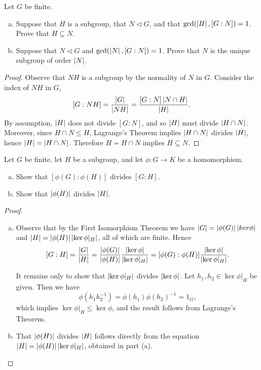 \documentclass[10pt]{amsart}
\begin{document}
\begin{thm}
  Let $G$ be finite.
  \begin{enumerate}[(a)]
	\item
		Suppose that $H$ is a subgroup, that $N \lhd G$, and that $\gcd(\left| H \right|, [G:N]) = 1$.
		Prove that $H \subseteq N$.
	\item
		Suppose that $N \lhd G$ and $\gcd(\left| N \right|, [G:N]) = 1$.
		Prove that $N$ is the unique subgroup of order $\left| N \right|$.
  \end{enumerate}
  \begin{proof}
	Observe that $NH$ is a subgroup by the normality of $N$ in $G$.
	Consider the index of $NH$ in $G$, $$[G : NH] = \frac{\left| G \right|}{\left| NH \right|} = \frac{[G:N]\left| N \cap H \right|}{\left| H \right|}.$$
	By assumption, $\left| H \right|$ does not divide $[G:N]$, and so $\left| H \right|$ must divide $\left| H \cap N \right|$.
	Moreover, since $H \cap N \leq H$, Lagrange's Theorem implies $\left| H \cap N \right|$ divides $\left| H \right|$, hence $\left| H \right| = \left| H \cap N \right|$.
	Therefore $H = H \cap N$ implies $H \subseteq N$.
  \end{proof}
\end{thm}
\begin{thm}
  Let $G$ be finite, let $H$ be a subgroup, and let $\phi \colon G \rightarrow K$ be a homomorphism.
  \begin{enumerate}[(a)]
	\item
		Show that $[\phi(G) : \phi(H)]$ divides $[G : H]$.
	\item
		Show that $\left| \phi(H) \right|$ divides $\left| H \right|$.
  \end{enumerate}
  \begin{proof}
	\begin{enumerate}[(a)]
		\item
			Observe that by the First Isomorphism Theorem we have $\left| G \right| = \left| \phi(G) \right|\left| ker\phi \right|$ and $\left| H \right| = \left| \phi(H) \right|\left| \ker\phi|_H \right|$, all of which are finite.
			Hence $$[G : H] = \frac{\left| G \right|}{\left| H \right|} 
							= \frac{\left| \phi(G) \right|}{\left| \phi(H) \right|}\frac{\left| \ker\phi \right|}{\left| \ker\phi|_H \right|}
							= [\phi(G) : \phi(H)]\frac{\left| \ker\phi \right|}{\left| \ker\phi|_H \right|}.$$
			
			It remains only to show that $\left| \ker\phi|_H \right|$ divides $\left| \ker\phi \right|$.
			Let $h_1, h_2 \in \ker\phi|_H$ be given.
			Then we have 
				$$\phi(h_1h_2^{-1}) = \phi(h_1)\phi(h_2)^{-1} = 1_G,$$
			which implies $\ker\phi|_H \leq \ker\phi$, and the result follows from Lagrange's Theorem.  
		\item
			That $\left| \phi(H) \right|$ divides $\left| H \right|$ follows directly from the equation $\left| H \right| = \left| \phi(H) \right|\left| \ker\phi|_H \right|$, obtained in part (a).
	\end{enumerate}
  \end{proof}
\end{thm}
\end{document}
